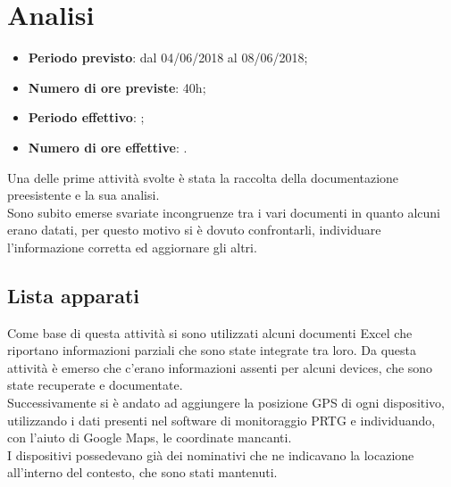 \documentclass[Realizzazione.tex]{subfiles}
\begin{document}
\section{Analisi}

\begin{itemize}
	\item \textbf{Periodo previsto}: dal 04/06/2018 al 08/06/2018;
	\item \textbf{Numero di ore previste}: 40h;
	\item \textbf{Periodo effettivo}: ;
	\item \textbf{Numero di ore effettive}: .
\end{itemize}

Una delle prime attività svolte è stata la raccolta della documentazione preesistente e la sua analisi. \\
Sono subito emerse svariate incongruenze tra i vari documenti in quanto alcuni erano datati, per questo motivo si è dovuto confrontarli, individuare l'informazione corretta ed aggiornare gli altri. \\

\subsection{Lista apparati}
Come base di questa attività si sono utilizzati alcuni documenti Excel che riportano informazioni parziali che sono state integrate tra loro. Da questa attività è emerso che c'erano informazioni assenti per alcuni devices, che sono state recuperate e documentate. \\
Successivamente si è andato ad aggiungere la posizione GPS di ogni dispositivo, utilizzando i dati presenti nel software di monitoraggio PRTG e individuando, con l'aiuto di Google Maps, le coordinate mancanti. \\
I dispositivi possedevano già dei nominativi che ne indicavano la locazione all'interno del contesto, che sono stati mantenuti. \\
\end{document}
